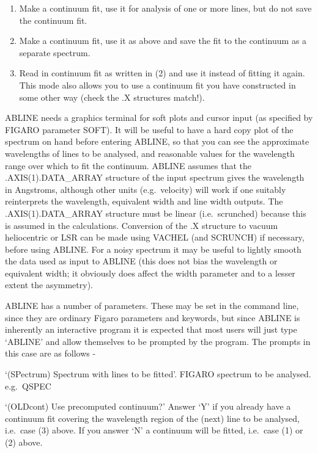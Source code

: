 \begin{enumerate}
\item Make a continuum fit, use it for analysis of one or more lines,
   but do not save the continuum fit.
\item Make a continuum fit, use it as above and save the fit to the
   continuum as a separate spectrum.
\item Read in continuum fit as written in (2) and use it instead of
   fitting it again. This mode also allows you to use a continuum fit
   you have constructed in some other way (check the .X structures
   match!).
\end{enumerate}

ABLINE needs a graphics terminal for soft plots and
cursor input (as specified by FIGARO parameter SOFT). It will be useful to have
a hard copy plot of the spectrum on hand before entering ABLINE, so that you
can see the approximate wavelengths of lines to be analysed, and reasonable
values for the wavelength range over which to fit the continuum. ABLINE assumes
that the .AXIS(1).DATA\_ARRAY
structure of the input spectrum gives the wavelength in
Angstroms, although other units (e.g.\ velocity) will work if one suitably
reinterprets the wavelength, equivalent width and line width outputs. 
The .AXIS(1).DATA\_ARRAY
structure must be linear (i.e.\ scrunched) because this is 
assumed in
the calculations. Conversion of the .X structure to vacuum heliocentric or LSR
can be made using VACHEL (and SCRUNCH) if necessary, before using ABLINE. For a
noisy spectrum it may be useful to lightly smooth the data used as input to
ABLINE (this does not bias the wavelength or equivalent width; it obviously
does affect the width parameter and to a lesser extent the asymmetry). 

ABLINE has a number of parameters.  These may be set in the command line,
since they are ordinary Figaro parameters and keywords, but since ABLINE is
inherently an interactive program it is expected that most users will just
type `ABLINE' and allow themselves to be prompted by the program.  The prompts
in this case are as follows -

`(SPectrum) Spectrum with lines to be fitted'. FIGARO spectrum to be 
analysed. e.g.\ QSPEC

`(OLDcont) Use precomputed continuum?' Answer `Y' if you
already have a continuum fit covering the wavelength region of the 
(next) line to be analysed, i.e.\ case (3) above. If you answer `N' a 
continuum will be fitted, i.e.\ case (1) or (2) above.


